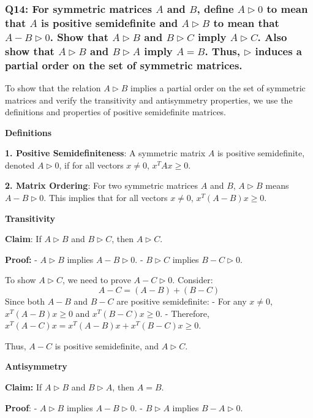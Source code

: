 \documentclass[8pt]{article}
\begin{document}
{\subsubsection*{Q14: For symmetric matrices \(A\) and \(B\), define \(A \triangleright 0\) to mean that \(A\) is positive semidefinite and \(A \triangleright B\) to mean that \(A - B \triangleright 0\). Show that \(A \triangleright B\) and \(B \triangleright C\) imply \(A \triangleright C\). Also show that \(A \triangleright B\) and \(B \triangleright A\) imply \(A = B\). Thus, \(\triangleright\) induces a partial order on the set of symmetric matrices.}

To show that the relation \(A \triangleright B\) implies a partial order on the set of symmetric matrices and verify the transitivity and antisymmetry properties, we use the definitions and properties of positive semidefinite matrices.

\textbf{Definitions}

\textbf{1. Positive Semidefiniteness}:
   A symmetric matrix \(A\) is positive semidefinite, denoted \(A \triangleright 0\), if for all vectors \(x \neq 0\), \(x^T A x \geq 0\).

\textbf{2. Matrix Ordering}:
   For two symmetric matrices \(A\) and \(B\), \(A \triangleright B\) means \(A - B \triangleright 0\). This implies that for all vectors \(x \neq 0\), \(x^T (A - B) x \geq 0\).

\textbf{Transitivity}

\textbf{Claim}: If \(A \triangleright B\) and \(B \triangleright C\), then \(A \triangleright C\).

\textbf{Proof:}
- \(A \triangleright B\) implies \(A - B \triangleright 0\).
- \(B \triangleright C\) implies \(B - C \triangleright 0\).
  
To show \(A \triangleright C\), we need to prove \(A - C \triangleright 0\). Consider:
\[
A - C = (A - B) + (B - C)
\]
Since both \(A - B\) and \(B - C\) are positive semidefinite:
- For any \(x \neq 0\), \(x^T (A - B) x \geq 0\) and \(x^T (B - C) x \geq 0\).
- Therefore, \(x^T (A - C) x = x^T (A - B) x + x^T (B - C) x \geq 0\).

Thus, \(A - C\) is positive semidefinite, and \(A \triangleright C\).

\textbf{Antisymmetry}

\textbf{Claim:} If \(A \triangleright B\) and \(B \triangleright A\), then \(A = B\).

\textbf{Proof}:
- \(A \triangleright B\) implies \(A - B \triangleright 0\).
- \(B \triangleright A\) implies \(B - A \triangleright 0\).

}
\end{document}
